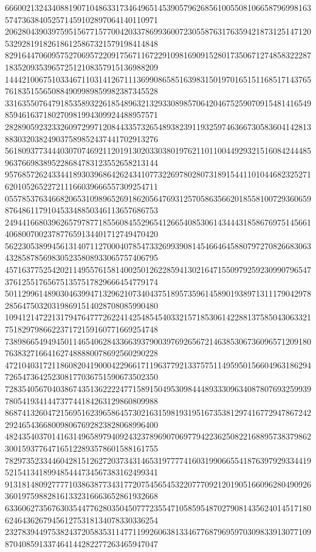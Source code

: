 \begin{DoxyCode}
      666002132434088190710486331734649651453905796268561005508106658796998163574736384052571459102897064140110971
      206280439039759515677157700420337869936007230558763176359421873125147120532928191826186125867321579198414848
      829164470609575270695722091756711672291098169091528017350671274858322287183520935396572512108357915136988209
      144421006751033467110314126711136990865851639831501970165151168517143765761835155650884909989859982387345528
      331635507647918535893226185489632132933089857064204675259070915481416549859461637180270981994309924488957571
      282890592323326097299712084433573265489382391193259746366730583604142813883032038249037589852437441702913276
      561809377344403070746921120191302033038019762110110044929321516084244485963766983895228684783123552658213144
      957685726243344189303968642624341077322697802807318915441101044682325271620105265227211166039666557309254711
      055785376346682065310989652691862056476931257058635662018558100729360659876486117910453348850346113657686753
      249441668039626579787718556084552965412665408530614344431858676975145661406800700237877659134401712749470420
      562230538994561314071127000407854733269939081454664645880797270826683063432858785698305235808933065757406795
      457163775254202114955761581400250126228594130216471550979259230990796547376125517656751357517829666454779174
      501129961489030463994713296210734043751895735961458901938971311179042978285647503203198691514028708085990480
      109412147221317947647772622414254854540332157185306142288137585043063321751829798662237172159160771669254748
      738986654949450114654062843366393790039769265672146385306736096571209180763832716641627488880078692560290228
      472104031721186082041900042296617119637792133757511495950156604963186294726547364252308177036751590673502350
      728354056704038674351362222477158915049530984448933309634087807693259939780541934144737744184263129860809988
      868741326047215695162396586457302163159819319516735381297416772947867242292465436680098067692823828068996400
      482435403701416314965897940924323789690706977942236250822168895738379862300159377647165122893578601588161755
      782973523344604281512627203734314653197777416031990665541876397929334419521541341899485444734567383162499341
      913181480927777103863877343177207545654532207770921201905166096280490926360197598828161332316663652861932668
      633606273567630354477628035045077723554710585954870279081435624014517180624643626794561275318134078330336254
      232783944975382437205835311477119926063813346776879695970309833913077109870408591337464144282277263465947047

\end{DoxyCode}
